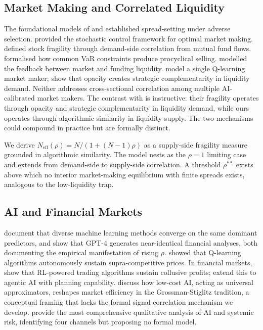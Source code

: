 \subsection{Market Making and Correlated Liquidity}

The foundational models of \citet{glosten1985} and \citet{kyle1985} established spread-setting under adverse selection. \citet{avellaneda2008} provided the stochastic control framework for optimal market making. \citet{greenwood2011} defined stock fragility through demand-side correlation from mutual fund flows. \citet{danielsson2012} formalised how common VaR constraints produce procyclical selling. \citet{brunnermeier2009} modelled the feedback between market and funding liquidity. \citet{colliard2025} model a single Q-learning market maker; \citet{cespa2025} show that opacity creates strategic complementarity in liquidity demand. Neither addresses cross-sectional correlation among multiple AI-calibrated market makers. The contrast with \citet{cespa2025} is instructive: their fragility operates through opacity and strategic complementarity in liquidity demand, while ours operates through algorithmic similarity in liquidity supply. The two mechanisms could compound in practice but are formally distinct.

We derive $N_{\text{eff}}(\rho) = N/(1+(N-1)\rho)$ as a supply-side fragility measure grounded in algorithmic similarity. The model nests \citet{danielsson2012} as the $\rho = 1$ limiting case and extends \citet{greenwood2011} from demand-side to supply-side correlation. A threshold $\rho^{**}$ exists above which no interior market-making equilibrium with finite spreads exists, analogous to the \citet{pagano1989} low-liquidity trap.

\subsection{AI and Financial Markets}

\citet{gu2020} document that diverse machine learning methods converge on the same dominant predictors, and \citet{kim2024} show that GPT-4 generates near-identical financial analyses, both documenting the empirical manifestation of rising $\rho$. \citet{calvano2020} showed that Q-learning algorithms autonomously sustain supra-competitive prices. In financial markets, \citet{dou2025a} show that RL-powered trading algorithms sustain collusive profits; \citet{dou2025b} extend this to agentic AI with planning capability. \citet{barucca2025} discuss how low-cost AI, acting as universal approximators, reshapes market efficiency in the Grossman-Stiglitz tradition, a conceptual framing that lacks the formal signal-correlation mechanism we develop. \citet{danielsson2022} provide the most comprehensive qualitative analysis of AI and systemic risk, identifying four channels but proposing no formal model.

